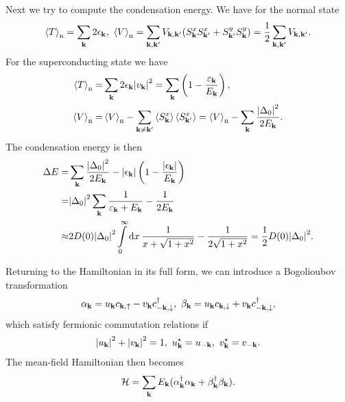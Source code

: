 Next we try to compute the condensation energy. We have for the normal state
\begin{align*}
	\expval{T}_{\text{n}} = \sum\limits_{\vb{k}}2\epsilon_{\vb{k}},\ \expval{V}_{\text{n}} = \sum\limits_{\vb{k}, \vb{k}\p}V_{\vb{k}, \vb{k}\p}(S_{\vb{k}}^{x}S_{\vb{k}\p}^{x} + S_{\vb{k}\p}^{y}S_{\vb{k}}^{y}) = \frac{1}{2}\sum\limits_{\vb{k}, \vb{k}\p}V_{\vb{k}, \vb{k}\p}.
\end{align*}
For the superconducting state we have
\begin{align*}
	\expval{T}_{\text{n}} =& \sum\limits_{\vb{k}}2\epsilon_{\vb{k}}\abs{v_{\vb{k}}}^{2} = \sum\limits_{\vb{k}}\left(1 - \frac{\varepsilon_{\vb{k}}}{E_{\vb{k}}}\right), \\
	\expval{V}_{\text{n}} =& \expval{V}_{\text{n}} - \sum\limits_{\vb{k} \neq \vb{k}^{\prime}}\expval{S_{\vb{k}}^{x}}\expval{S_{\vb{k}\ensuremath{^{\prime}}}^{x}} = \expval{V}_{\text{n}} - \sum\limits_{\vb{k}}\frac{\abs{\Delta_{0}}^{2}}{2E_{\vb{k}}}.
\end{align*}
The condensation energy is then
\begin{align*}
	\Delta E =& \sum\limits_{\vb{k}}\frac{\abs{\Delta_{0}}^{2}}{2E_{\vb{k}}} - \abs{\epsilon_{\vb{k}}}\left(1 - \frac{\abs{\epsilon_{\vb{k}}}}{E_{\vb{k}}}\right) \\
	         =& \abs{\Delta_{0}}^{2}\sum\limits_{\vb{k}}\frac{1}{\varepsilon_{\vb{k}} + E_{\vb{k}}} - \frac{1}{2E_{\vb{k}}} \\
	   \approx& 2D(0)\abs{\Delta_{0}}^{2}\int\limits_{0}^{\infty}\dd{x}\frac{1}{x + \sqrt{1 + x^{2}}} - \frac{1}{2\sqrt{1 + x^{2}}} = \frac{1}{2}D(0)\abs{\Delta_{0}}^{2}.
\end{align*}

Returning to the Hamiltonian in its full form, we can introduce a Bogolioubov transformation
\begin{align*}
	\alpha_{\vb{k}} = u_{\vb{k}}c_{\vb{k}, \uparrow} - v_{\vb{k}}c_{-\vb{k}, \downarrow}^{\dagger},\ \beta_{\vb{k}} = u_{\vb{k}}c_{\vb{k}, \downarrow} + v_{\vb{k}}c_{-\vb{k}, \downarrow}^{\dagger},
\end{align*}
which satisfy fermionic commutation relations if
\begin{align*}
	\abs{u_{\vb{k}}}^{2} + \abs{v_{\vb{k}}}^{2} = 1,\ u_{\vb{k}}^{\star} = u_{-\vb{k}},\ v_{\vb{k}}^{\star} = v_{-\vb{k}}.
\end{align*}
The mean-field Hamiltonian then becomes
\begin{align*}
	\mathcal{H} = \sum\limits_{\vb{k}}E_{\vb{k}}(\alpha_{\vb{k}}^{\dagger}\alpha_{\vb{k}} + \beta_{\vb{k}}^{\dagger}\beta_{\vb{k}}).
\end{align*}